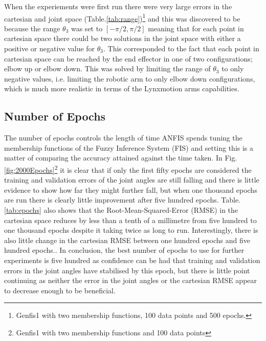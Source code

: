 \documentclass[11.5pt, twoside, a4paper]{article}
\begin{document}
When the experiements were first run there were very large errors in the cartesian and joint space (Table.\ref{tab:range})\footnote{Genfis1 with two membership functions, 100 data points and 500 epochs.} and this was discovered to be because the range $\theta_3$ was set to $\left[-\pi/2,\pi/2\right]$ meaning that for each point in cartesian space there could be two solutions in the joint space with either a positive or negative value for $\theta_3$. This corresponded to the fact that each point in cartesian space can be reached by the end effector in one of two configurations; elbow up or elbow down. This was solved by limiting the range of $\theta_3$ to only negative values, i.e. limiting the robotic arm to only elbow down configurations, which is much more realistic in terms of the Lynxmotion arms capabilities.

\begin{table}
\caption{Results from changing range of $\theta_3$. \label{tab:range}}
\end{table}


\subsection{Number of Epochs}
The number of epochs controls the length of time ANFIS spends tuning the membership functions of the Fuzzy Inference System (FIS) and setting this is a matter of comparing the accuracy attained against the time taken. In Fig.\ref{fig:2000Epochs}\footnote{Genfis1 with two membership functions and 100 data points} it is clear that if only the first fifty epochs are considered the training and validation errors of the joint angles are still falling and there is little evidence to show how far they might further fall, but when one thousand epochs are run there is clearly little improvement after five hundred epochs. Table.\ref{tab:epochs} also shows that the Root-Mean-Squared-Error (RMSE) in the cartesian space reduces by less than a tenth of a millimetre from five hundred to one thousand epochs despite it taking twice as long to run. Interestingly, there is also little change in the cartesian RMSE between one hundred epochs and five hundred epochs.. In conclusion, the best number of epochs to use for further experiments is five hundred as confidence can be had that training and validation errors in the joint angles have stabilised by this epoch, but there is little point continuing as neither the error in the joint angles or the cartesian RMSE appear to decrease enough to be beneficial.
\end{document}
